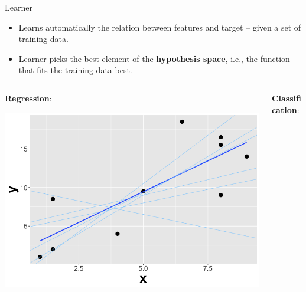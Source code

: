 \documentclass[11pt,compress,t,notes=noshow, xcolor=table]{beamer}
\begin{document}
\begin{vbframe}{Learner}

\begin{itemize}

\item Learns automatically the relation between features and target -- given a set of training data.
\item Learner picks the best element of the \textbf{hypothesis space}, i.e., the function that fits the training data best.
\end{itemize} \hspace{0.4cm}

\begin{columns}    
\begin{column}{0.4\textwidth} 
\textbf{Regression}: 

  \begin{center}
    \includegraphics[width=\textwidth]{slides/ml-basics/figure/nutshell-ml-basics-hypothesisspace-regr.png} 
  \end{center}
\end{column}    

\begin{column}{0.4\textwidth} 
\textbf{Classification}:
  

\end{column}
\end{columns}
\end{vbframe}
\end{document}
